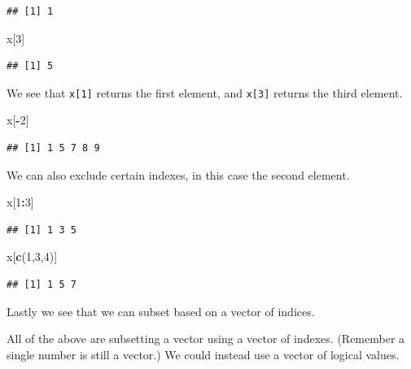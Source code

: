 \documentclass[]{book}
\newenvironment{Shaded}{\begin{snugshade}}{\end{snugshade}}
\newcommand{\KeywordTok}[1]{\textcolor[rgb]{0.13,0.29,0.53}{\textbf{#1}}}
\newcommand{\DecValTok}[1]{\textcolor[rgb]{0.00,0.00,0.81}{#1}}
\newcommand{\OperatorTok}[1]{\textcolor[rgb]{0.81,0.36,0.00}{\textbf{#1}}}
\newcommand{\NormalTok}[1]{#1}
\theoremstyle{definition}
\theoremstyle{definition}
\theoremstyle{definition}
\theoremstyle{remark}
\begin{document}
\begin{verbatim}
## [1] 1
\end{verbatim}

\begin{Shaded}
\begin{Highlighting}[]
\NormalTok{x[}\DecValTok{3}\NormalTok{]}
\end{Highlighting}
\end{Shaded}

\begin{verbatim}
## [1] 5
\end{verbatim}

We see that \texttt{x{[}1{]}} returns the first element, and
\texttt{x{[}3{]}} returns the third element.

\begin{Shaded}
\begin{Highlighting}[]
\NormalTok{x[}\OperatorTok{-}\DecValTok{2}\NormalTok{]}
\end{Highlighting}
\end{Shaded}

\begin{verbatim}
## [1] 1 5 7 8 9
\end{verbatim}

We can also exclude certain indexes, in this case the second element.

\begin{Shaded}
\begin{Highlighting}[]
\NormalTok{x[}\DecValTok{1}\OperatorTok{:}\DecValTok{3}\NormalTok{]}
\end{Highlighting}
\end{Shaded}

\begin{verbatim}
## [1] 1 3 5
\end{verbatim}

\begin{Shaded}
\begin{Highlighting}[]
\NormalTok{x[}\KeywordTok{c}\NormalTok{(}\DecValTok{1}\NormalTok{,}\DecValTok{3}\NormalTok{,}\DecValTok{4}\NormalTok{)]}
\end{Highlighting}
\end{Shaded}

\begin{verbatim}
## [1] 1 5 7
\end{verbatim}

Lastly we see that we can subset based on a vector of indices.

All of the above are subsetting a vector using a vector of indexes.
(Remember a single number is still a vector.) We could instead use a
vector of logical values.
\end{document}
